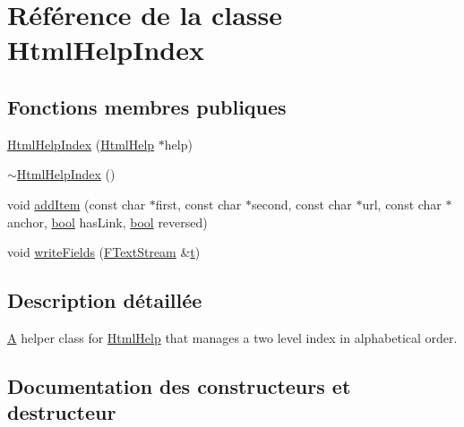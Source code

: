 \hypertarget{class_html_help_index}{}\section{Référence de la classe Html\+Help\+Index}
\label{class_html_help_index}
\subsection*{Fonctions membres publiques}
\begin{DoxyCompactItemize}
\item 
\hyperlink{class_html_help_index_a9a6f1abc33b6d3679229d9dbd5ed92d9}{Html\+Help\+Index} (\hyperlink{class_html_help}{Html\+Help} $\ast$help)
\item 
\hyperlink{class_html_help_index_a0b68b2ca104803c3a6dc76a18aa05f13}{$\sim$\+Html\+Help\+Index} ()
\item 
void \hyperlink{class_html_help_index_aa6f679550c81eee3249f29395ad7e174}{add\+Item} (const char $\ast$first, const char $\ast$second, const char $\ast$url, const char $\ast$anchor, \hyperlink{qglobal_8h_a1062901a7428fdd9c7f180f5e01ea056}{bool} has\+Link, \hyperlink{qglobal_8h_a1062901a7428fdd9c7f180f5e01ea056}{bool} reversed)
\item 
void \hyperlink{class_html_help_index_aa7658c0bcf38f46aed6664cd5dbd1be1}{write\+Fields} (\hyperlink{class_f_text_stream}{F\+Text\+Stream} \&\hyperlink{058__bracket__recursion_8tcl_a69e959f6901827e4d8271aeaa5fba0fc}{t})
\end{DoxyCompactItemize}


\subsection{Description détaillée}
\hyperlink{class_a}{A} helper class for \hyperlink{class_html_help}{Html\+Help} that manages a two level index in alphabetical order. 

\subsection{Documentation des constructeurs et destructeur}
\hypertarget{class_html_help_index_a9a6f1abc33b6d3679229d9dbd5ed92d9}{}
